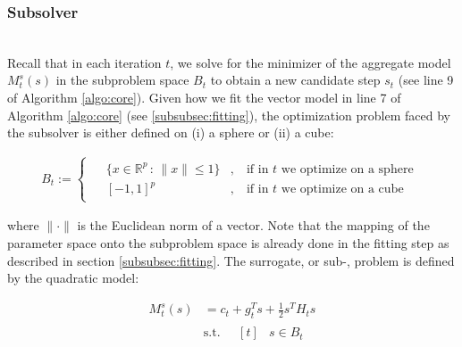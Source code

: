 \subsubsection{Subsolver}
\label{subsubsec:subsolver}
\hfill\\

\noindent Recall that in each iteration $t$, we solve for the minimizer of the aggregate model $M_{t}^{s} (s)$ in the subproblem space $B_t$ to obtain a new candidate step $s_t$ (see line 9 of Algorithm \ref{algo:core}).
Given how we fit the vector model in line 7 of Algorithm \ref{algo:core} (see \ref{subsubsec:fitting}), the optimization problem faced by the subsolver is either defined on (i) a sphere or (ii) a cube:


\begin{align}
    B_t := \begin{cases}
    \begin{aligned}
        & \{x \in \mathbb{R}^p \, : \, \lVert x \rVert \leq 1 \} & , \ & \text{if  in $t$ we optimize on a sphere} \\
        & [-1, 1]^p & , \ & \text{if in $t$ we optimize on a cube}
    \end{aligned}
    \end{cases}
    \label{eq:ball-metric}
\end{align}

\noindent where $\lVert\cdot\rVert$ is the Euclidean norm of a vector.
Note that the mapping of the parameter space onto the subproblem space is already done in the fitting step as described in section \ref{subsubsec:fitting}.
The surrogate, or sub-, problem is defined by the quadratic model:

\begin{align}
    M_{t}^{s} (s) &= c_t + g_t^T s + \frac{1}{2} s^T H_t s \\
    &\text{s.t.} \quad \begin{aligned}[t]
        & s \in B_t
    \end{aligned}
    \label{eq:quad-subproblem}
\end{align}


